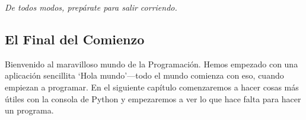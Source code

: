\noindent
\emph{De todos modos, prepárate para salir corriendo.}

\subsection*{\color{BrickRed}El Final del Comienzo}

Bienvenido al maravilloso mundo de la Programación. Hemos empezado con una aplicación sencillita `Hola mundo'---todo el mundo comienza con eso, cuando empiezan a programar.
En el siguiente capítulo comenzaremos a hacer cosas más útiles con la consola de Python y empezaremos a ver lo que hace falta para hacer un programa.

\newpage
